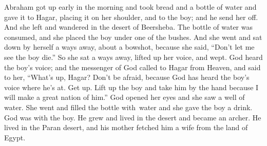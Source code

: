 \begin{inparaenum}
     Abraham got up early in the morning and took bread and a bottle of water and gave it to Hagar, placing it on her shoulder, and to the boy; and he send her off. And she left and wandered in the desert of Beersheba.%
     The bottle of water was consumed, and she placed the boy under one of the bushes.%
     And she went and sat down by herself a ways away, about a bowshot, because she said, ``Don't let me see the boy die.'' So she sat a ways away, lifted up her voice, and wept.%
     God heard the boy's voice; and the messenger of God called to Hagar from Heaven, and said to her, ``What's up, Hagar? Don't be afraid, because God has heard the boy's voice where he's at.%
     Get up. Lift up the boy and take him by the hand because I will make a great nation of him.''%
     God opened her eyes and she saw a well of water. She went and filled the bottle with\understood\ water and she gave the boy a drink.%
     God was with the boy. He grew and lived in the desert and became an archer.%
     He lived in the Paran desert, and his mother fetched him a wife from the land of Egypt.%
    

\end{inparaenum}
